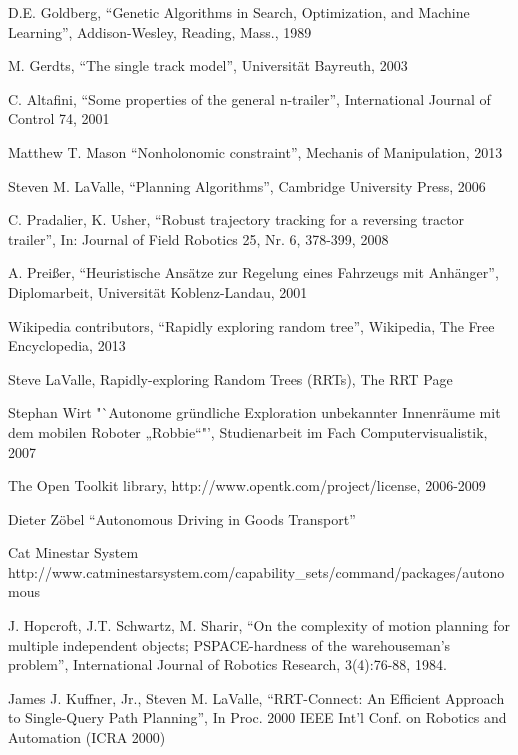 \documentclass[bsc,en,
oneside,12pt,utf8,a4paper,
]{thesisdifctunl}
\begin{document}
\begin{thebibliography}{9}
	D.E. Goldberg,
	"`Genetic Algorithms in Search, Optimization, and Machine Learning"',
	Addison-Wesley, Reading, Mass.,
	1989
	
	M. Gerdts,
	"`The single track model"',
	Universität Bayreuth,
	2003
	
	C. Altafini,
	"`Some properties of the general n-trailer"',
	International Journal of Control 74,
	2001
	
	Matthew T. Mason
	"`Nonholonomic constraint"',
	Mechanis of Manipulation,
	2013
	
	Steven M. LaValle,
	"`Planning Algorithms"',
	Cambridge University Press,
	2006
	
	C. Pradalier, K. Usher,
	"`Robust trajectory tracking for a reversing tractor trailer"',
	In: Journal of Field Robotics 25, Nr. 6, 378-399,
	2008
	
	A. Preißer,
	"`Heuristische Ansätze zur Regelung eines Fahrzeugs mit Anhänger"',
	Diplomarbeit, Universität Koblenz-Landau,
	2001
	
	Wikipedia contributors,
	"`Rapidly exploring random tree"',
	Wikipedia, The Free Encyclopedia,
	2013
	
	Steve LaValle,
	Rapidly-exploring Random Trees (RRTs),
	The RRT Page

	Stephan Wirt
	"`Autonome gründliche Exploration unbekannter Innenräume mit dem mobilen Roboter „Robbie“"',
	Studienarbeit im Fach Computervisualistik,
	2007
	
	The Open Toolkit library,
	http://www.opentk.com/project/license,
	2006-2009
	
	Dieter Zöbel
	"`Autonomous Driving in Goods Transport"'
	
	Cat Minestar System
	http://www.catminestarsystem.com/capability_sets/command/packages/autonomous
	
	J. Hopcroft, J.T. Schwartz, M. Sharir,
	"`On the complexity of motion planning for multiple independent objects; PSPACE-hardness of the warehouseman's problem"',
	International Journal of Robotics Research, 3(4):76-88,
	1984.
	
	James J. Kuffner, Jr., Steven M. LaValle,
	"`RRT-Connect: An Eﬃcient Approach to Single-Query Path Planning"',
	In Proc. 2000 IEEE Int’l Conf. on Robotics and Automation (ICRA 2000)

\end{thebibliography}


\end{document}
